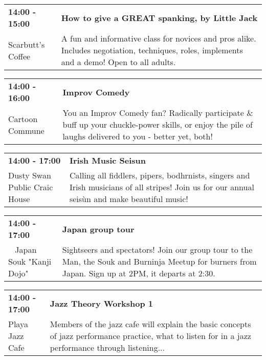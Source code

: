 \begin{tabular}{ p{1in} p{2.2in} }
    \textbf{14:00 - 15:00} & \textbf{How to give a GREAT spanking, by Little Jack} \\
    Scarbutt's Coffee \newline  & A fun and informative class for novices and pros alike. Includes negotiation, techniques, roles, implements and a demo! Open to all adults. \\
    \hline 
\end{tabular}
    
\begin{tabular}{ p{1in} p{2.2in} }
    \textbf{14:00 - 16:00} & \textbf{Improv Comedy} \\
    Cartoon Commune \newline  & You an Improv Comedy fan? Radically participate \& buff up your chuckle-power skills, or enjoy the pile of laughs delivered to you - better yet, both! \\
    \hline 
\end{tabular}
    
\begin{tabular}{ p{1in} p{2.2in} }
    \textbf{14:00 - 17:00} & \textbf{Irish Music Seisun} \\
    Dusty Swan Public Craic House \newline  & Calling all fiddlers, pipers, bodhrnists, singers and Irish musicians of all stripes! Join us for our annual seis\`un and make beautiful music! \\
    \hline 
\end{tabular}
    
\begin{tabular}{ p{1in} p{2.2in} }
    \textbf{14:00 - 17:00} & \textbf{Japan group tour} \\
    ~ \newline Japan Souk "Kanji Dojo" & Sightseers and spectators! Join our group tour to the Man, the Souk and Burninja Meetup for burners from Japan. Sign up at 2PM, it departs at 2:30. \\
    \hline 
\end{tabular}
    
\begin{tabular}{ p{1in} p{2.2in} }
    \textbf{14:00 - 17:00} & \textbf{Jazz Theory Workshop 1} \\
    Playa Jazz Cafe \newline  & Members of the jazz cafe will explain the basic concepts of jazz performance practice, what to listen for in a jazz performance through listening... \\
    \hline 
\end{tabular}
    
